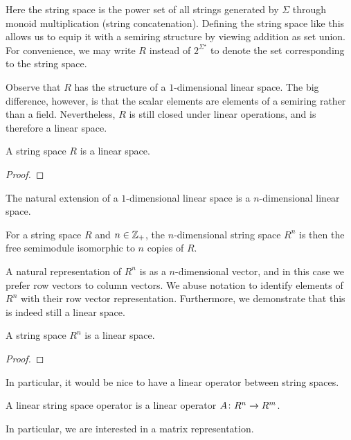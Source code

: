 \documentclass[12pt]{article}
\begin{document}
Here the string space is the power set of all strings generated
by \(\Sigma\) through monoid multiplication (string concatenation).
Defining the string space like this allows us to equip it with a semiring
structure by viewing addition as set union.
For convenience,
we may write \(R\) instead of \(2^{\Sigma^\star}\)
to denote the set corresponding to the string space.

Observe that \(R\) has the structure of a \(1\)-dimensional linear space.
The big difference, however, is that the scalar elements are
elements of a semiring rather than a field.
Nevertheless, \(R\) is still closed under linear operations,
and is therefore a linear space.

\begin{theorem}
  A string space \(R\) is a linear space.
\end{theorem}
\begin{proof}
\end{proof}

The natural extension of a \(1\)-dimensional linear space
is a \(n\)-dimensional linear space.

\begin{definition}
  For a string space \(R\) and \(n \in \mathbb{Z}_{+}\),
  the \(n\)-dimensional string space \(R^n\) is then the
  free semimodule isomorphic to \(n\) copies of \(R\).
\end{definition}

A natural representation of \(R^n\) is as a \(n\)-dimensional vector,
and in this case we prefer row vectors to column vectors.
We abuse notation to identify elements of \(R^n\) with their
row vector representation.
Furthermore, we demonstrate that this is indeed still a linear space.

\begin{theorem}
  A string space \(R^n\) is a linear space.
\end{theorem}
\begin{proof}
\end{proof}

In particular, it would be nice to have a linear operator
between string spaces.

\begin{definition}
  A linear string space operator
  is a linear operator \(A \colon R^n \to R^m\).
\end{definition}

In particular, we are interested in a matrix representation.
\end{document}
